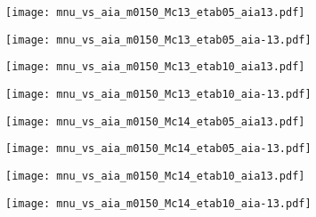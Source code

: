 \documentclass[a4paper,11pt]{article}
\begin{document}
\begin{figure}[!t]
        \centering
        \begin{subfigure}[b]{0.25\textwidth}
            \centering
            \texttt{[image: mnu\_vs\_aia\_m0150\_Mc13\_etab05\_aia13.pdf]}
        \end{subfigure}
        \hspace{-.7\baselineskip}
        \begin{subfigure}[b]{0.25\textwidth}  
            \centering 
            \texttt{[image: mnu\_vs\_aia\_m0150\_Mc13\_etab05\_aia-13.pdf]}
        \end{subfigure}
        \hspace{-.7\baselineskip}
        \begin{subfigure}[b]{0.25\textwidth}
            \centering
            \texttt{[image: mnu\_vs\_aia\_m0150\_Mc13\_etab10\_aia13.pdf]}
        \end{subfigure}
        \hspace{-.7\baselineskip}
        \begin{subfigure}[b]{0.25\textwidth}  
            \centering 
            \texttt{[image: mnu\_vs\_aia\_m0150\_Mc13\_etab10\_aia-13.pdf]}
        \end{subfigure}

        \begin{subfigure}[b]{0.25\textwidth}
            \centering
            \texttt{[image: mnu\_vs\_aia\_m0150\_Mc14\_etab05\_aia13.pdf]}
        \end{subfigure}
        \hspace{-.7\baselineskip}
        \begin{subfigure}[b]{0.25\textwidth}  
            \centering 
            \texttt{[image: mnu\_vs\_aia\_m0150\_Mc14\_etab05\_aia-13.pdf]}
        \end{subfigure}
        \hspace{-.7\baselineskip}
        \begin{subfigure}[b]{0.25\textwidth}
            \centering
            \texttt{[image: mnu\_vs\_aia\_m0150\_Mc14\_etab10\_aia13.pdf]}
        \end{subfigure}
        \hspace{-.7\baselineskip}
        \begin{subfigure}[b]{0.25\textwidth}  
            \centering 
            \texttt{[image: mnu\_vs\_aia\_m0150\_Mc14\_etab10\_aia-13.pdf]}
        \end{subfigure}


\end{figure}
\end{document}
